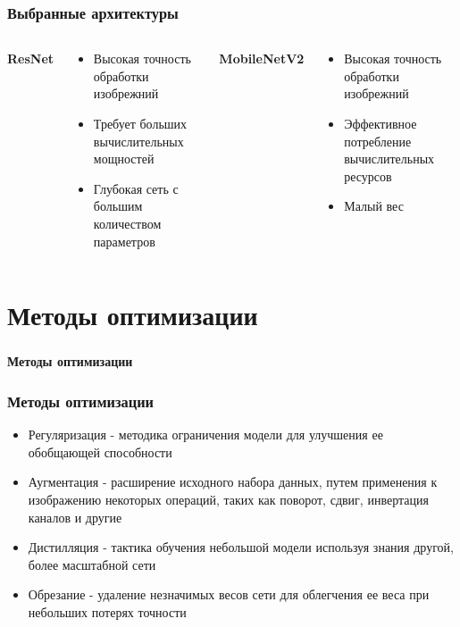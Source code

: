 \documentclass[usenames,dvipsnames, 10pt]{beamer}
\begin{document}
\begin{frame}
\frametitle{Выбранные архитектуры}
  \begin{columns}
    \begin{center}
      \textbf{ResNet}
    \end{center}
    \vspace{0.1cm} %

    \begin{center}
      \begin{itemize}
          \item Высокая точность обработки изобрежний
          \item Требует больших вычислительных мощностей
          \item Глубокая сеть с большим количеством параметров
      \end{itemize}
    \end{center}

    \begin{center}
      \textbf{MobileNetV2}
    \end{center}
    \vspace{0.2cm} %

    \begin{center}
        \begin{itemize}
          \item Высокая точность обработки изобрежний
          \item Эффективное потребление вычислительных ресурсов
          \item Малый вес
        \end{itemize}
    \end{center}
  \end{columns}
\end{frame}

\section{Методы оптимизации}
\begin{frame}
\frametitle{\phatom}
\centering
\Large \textbf{Методы оптимизации}
\end{frame}
\begin{frame}
\frametitle{Методы оптимизации}
\begin{itemize}
    \item Регуляризация - методика ограничения модели для улучшения ее обобщающей способности
    \item Аугментация - расширение исходного набора данных, путем применения к изображению некоторых операций, таких как поворот, сдвиг, инвертация каналов и другие
    \item Дистилляция - тактика обучения небольшой модели используя знания другой, более масштабной сети
    \item Обрезание - удаление незначимых весов сети для облегчения ее веса при небольших потерях точности
\end{itemize}
\end{frame}
\end{document}
